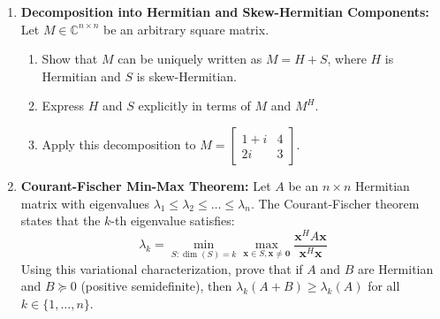 \begin{enumerate}[label=\textbf{P\arabic*.}]
    \item \textbf{Decomposition into Hermitian and Skew-Hermitian Components:}
    Let $M \in \mathbb{C}^{n \times n}$ be an arbitrary square matrix.
    \begin{enumerate}[label=(\alph*)]
        \item Show that $M$ can be uniquely written as $M = H + S$, where $H$ is Hermitian and $S$ is skew-Hermitian.
        \item Express $H$ and $S$ explicitly in terms of $M$ and $M^H$.
        \item Apply this decomposition to $M = \begin{bmatrix} 1 + i & 4 \\ 2i & 3 \end{bmatrix}$.
    \end{enumerate}

    \item \textbf{Courant-Fischer Min-Max Theorem:}
    Let $A$ be an $n \times n$ Hermitian matrix with eigenvalues $\lambda_1 \le \lambda_2 \le \dots \le \lambda_n$.
    The Courant-Fischer theorem states that the $k$-th eigenvalue satisfies:
    \begin{equation}
    \lambda_k = \min_{S: \dim(S) = k} \max_{\mathbf{x} \in S, \mathbf{x} \ne \mathbf{0}} \frac{\mathbf{x}^H A \mathbf{x}}{\mathbf{x}^H \mathbf{x}}
    \end{equation}
    Using this variational characterization, prove that if $A$ and $B$ are Hermitian and $B \succeq 0$ (positive semidefinite), then $\lambda_k(A + B) \ge \lambda_k(A)$ for all $k \in \{1, \dots, n\}$.


\end{enumerate}
